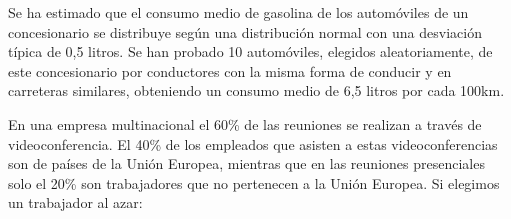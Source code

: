\documentclass[addpoints,spanish, 12pt,a4paper]{exam}
\renewcommand*\half{.5}
\begin{document}
\begin{questions}

\question[2\half] Se ha estimado que el consumo medio de gasolina de los automóviles de un concesionario se distribuye según una distribución normal con una desviación típica de 0,5 litros. Se han probado 10 automóviles, elegidos aleatoriamente, de este concesionario por conductores con la misma forma de conducir y en carreteras similares, obteniendo un consumo medio de 6,5 litros por cada 100km.

\question[2\half] En una empresa multinacional el 60\% de las reuniones se realizan a través de videoconferencia. El 40\% de los empleados que asisten a estas videoconferencias son de países de la Unión Europea, mientras que en las reuniones presenciales solo el 20\% son trabajadores que no pertenecen a la Unión Europea. Si elegimos un trabajador al azar:
\begin{parts}

\end{parts}
\end{questions}
\end{document}
